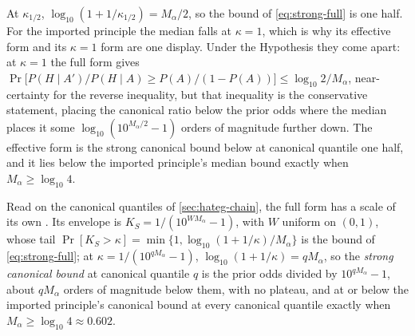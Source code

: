 \documentclass[11pt]{article}
\theoremstyle{definition}
\begin{document}
\noindent At $\kappa_{1/2}$, $\log_{10}(1 + 1/\kappa_{1/2}) = M_\alpha/2$, so the bound of \eqref{eq:strong-full} is one half. For the imported principle the median falls at $\kappa = 1$, which is why its effective form and its $\kappa = 1$ form are one display. Under the Hypothesis they come apart: at $\kappa = 1$ the full form gives $\Pr\big[P(H \mid A')/P(H \mid A) \ge P(A)/(1 - P(A))\big] \le \log_{10} 2/M_\alpha$, near-certainty for the reverse inequality, but that inequality is the conservative statement, placing the canonical ratio below the prior odds where the median places it some $\log_{10}(10^{M_\alpha/2} - 1)$ orders of magnitude further down. The effective form is the strong canonical bound below at canonical quantile one half, and it lies below the imported principle's median bound exactly when $M_\alpha \ge \log_{10} 4$.

\noindent Read on the canonical quantiles of \autoref{sec:hateg-chain}, the full form has a scale of its own \cite{Nexus}. Its envelope is $K_S = 1/(10^{WM_\alpha} - 1)$, with $W$ uniform on $(0,1)$, whose tail $\Pr[K_S > \kappa] = \min\{1, \log_{10}(1 + 1/\kappa)/M_\alpha\}$ is the bound of \eqref{eq:strong-full}; at $\kappa = 1/(10^{qM_\alpha} - 1)$, $\log_{10}(1 + 1/\kappa) = qM_\alpha$, so the \emph{strong canonical bound} at canonical quantile $q$ is the prior odds divided by $10^{qM_\alpha} - 1$, about $qM_\alpha$ orders of magnitude below them, with no plateau, and at or below the imported principle's canonical bound at every canonical quantile exactly when $M_\alpha \ge \log_{10} 4 \approx 0.602$.
\end{document}
